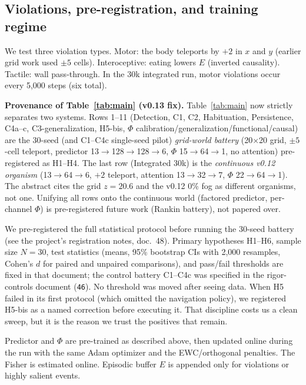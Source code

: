 \documentclass[11pt,a4paper]{article}
\begin{document}
\subsection{Violations, pre-registration, and training regime}

We test three violation types. Motor: the body teleports by $+2$ in $x$ and $y$ (earlier grid work used $\pm5$ cells). Interoceptive: eating lowers $E$ (inverted causality). Tactile: wall pass-through. In the 30k integrated run, motor violations occur every 5,000 steps (six total).

\textbf{Provenance of Table~\ref{tab:main} (v0.13 fix).} Table~\ref{tab:main} now strictly separates two systems. Rows 1--11 (Detection, C1, C2, Habituation, Persistence, C4a--c, C3-generalization, H5-bis, $\Phi$ calibration/generalization/functional/causal) are the 30-seed (and C1--C4c single-seed pilot) \textit{grid-world battery} (20$\times$20 grid, $\pm5$-cell teleport, predictor 13$\rightarrow$128$\rightarrow$128$\rightarrow$6, $\Phi$ 15$\rightarrow$64$\rightarrow$1, no attention) pre-registered as H1--H4. The last row (Integrated 30k) is the \textit{continuous v0.12 organism} (13$\rightarrow$64$\rightarrow$6, $+2$ teleport, attention 13$\rightarrow$32$\rightarrow$7, $\Phi$ 22$\rightarrow$64$\rightarrow$1). The abstract cites the grid $z=20.6$ and the v0.12 0\% fog as different organisms, not one. Unifying all rows onto the continuous world (factored predictor, per-channel $\Phi$) is pre-registered future work (Rankin battery), not papered over.

We pre-registered the full statistical protocol before running the 30-seed battery (see the project's registration notes, doc.~48). Primary hypotheses H1--H6, sample size $N=30$, test statistics (means, 95\% bootstrap CIs with 2,000 resamples, Cohen's $d$ for paired and unpaired comparisons), and pass/fail thresholds are fixed in that document; the control battery C1--C4c was specified in the rigor-controls document (\texttt{46}). No threshold was moved after seeing data. When H5 failed in its first protocol (which omitted the navigation policy), we registered H5-bis as a named correction before executing it. That discipline costs us a clean sweep, but it is the reason we trust the positives that remain.

Predictor and $\Phi$ are pre-trained as described above, then updated online during the run with the same Adam optimizer and the EWC/orthogonal penalties. The Fisher is estimated online. Episodic buffer $E$ is appended only for violations or highly salient events.
\end{document}
